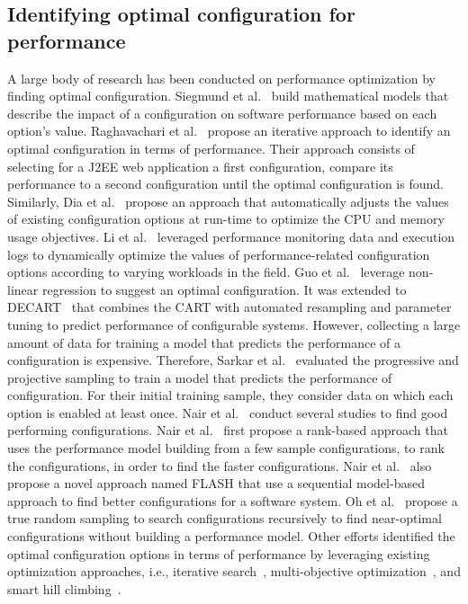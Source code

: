 \subsection{Identifying optimal configuration for performance} 
A large body of research has been conducted on performance optimization by finding optimal configuration. 
Siegmund et al.~\cite{RN2880} build mathematical models that describe the impact of a configuration on software performance based on each option's value. Raghavachari et al.~\cite{RN3537} propose an iterative approach to identify an optimal configuration in terms of performance. Their approach consists of selecting for a J2EE web application a first configuration, compare its performance to a second configuration until the optimal configuration is found. Similarly, Dia et al.~\cite{RN3543} propose an approach that automatically adjusts the values of existing configuration options at run-time to optimize the CPU and memory usage objectives.
Li et al.~\cite{LiAutoConfig} leveraged performance monitoring data and execution logs to dynamically optimize the values of performance-related configuration options according to varying workloads in the field. 
Guo et al.~\cite{RN3544} leverage non-linear regression to suggest an optimal configuration.
It was extended to DECART~\cite{DBLP:journals/ese/GuoYSASVCWY18} that combines the CART with automated resampling and parameter tuning to predict performance of configurable systems. However, collecting a large amount of data for training a model that predicts the performance of a configuration is expensive.
Therefore, Sarkar et al.~\cite{RN3089} evaluated the progressive and projective sampling to train a model that predicts the performance of configuration. For their initial training sample, they consider data on which each option is enabled at least once. 
Nair et al.~\cite{DBLP:conf/sigsoft/NairMSA17,DBLP:journals/tse/Nair0MSA20} conduct several studies to find good performing configurations. 
Nair et al.~\cite{DBLP:conf/sigsoft/NairMSA17} first propose a rank-based approach that uses the performance model building from a few sample configurations, to rank the configurations, in order to find the faster configurations. 
Nair et al.~\cite{DBLP:journals/tse/Nair0MSA20} also propose a novel approach named FLASH that use a sequential model-based approach to find better configurations for a software system. 
Oh et al.~\cite{DBLP:conf/sigsoft/OhBMS17} propose a true random sampling to search configurations recursively to find near-optimal configurations without building a performance model.
Other efforts identified the optimal configuration options in terms of performance by leveraging existing optimization approaches, i.e., iterative search~\cite{RN3545}, multi-objective optimization~\cite{singh2016optimizing}, and smart hill climbing~\cite{RN3518}.

